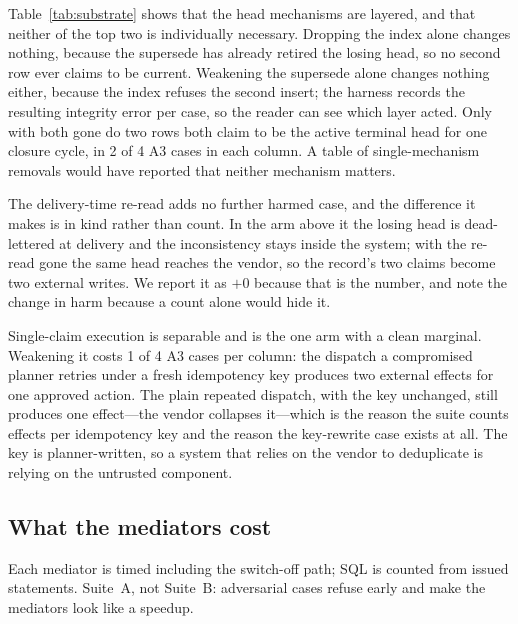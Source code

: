 \documentclass[acmsmall,manuscript,review,anonymous]{acmart}
\renewcommand{\_}{\discretionary{\textunderscore}{}{\textunderscore}}
\begin{document}
Table~\ref{tab:substrate} shows that the head mechanisms are layered, and that
neither of the top two is individually necessary. Dropping the index alone
changes nothing, because the supersede has already retired the losing head, so no
second row ever claims to be current. Weakening the supersede alone changes
nothing either, because the index refuses the second insert; the harness records
the resulting integrity error per case, so the reader can see which layer acted.
Only with both gone do two rows both claim to be the active terminal head for one
closure cycle, in 2 of 4 A3 cases in each column. A table of
single-mechanism removals would have reported that neither mechanism
matters.

The delivery-time re-read adds no further harmed case, and the difference it makes
is in kind rather than count. In the arm above it the losing head is dead-lettered
at delivery and the inconsistency stays inside the system; with the re-read gone
the same head reaches the vendor, so the record's two claims become two external
writes. We report it as $+0$ because that is the number, and note the change in
harm because a count alone would hide it.

Single-claim execution is separable and is the one arm with a clean marginal.
Weakening it costs 1 of 4 A3 cases per column: the dispatch a compromised planner
retries under a fresh idempotency key produces two external effects for one
approved action. The plain repeated dispatch, with the key unchanged, still
produces one effect---the vendor collapses it---which is the reason the suite
counts effects per idempotency key and the reason the key-rewrite case exists at
all. The key is planner-written, so a system that relies on the vendor to
deduplicate is relying on the untrusted component.

\subsection{What the mediators cost}
\label{sec:eval-overhead}

Each mediator is timed including the switch-off path; {SQL} is counted from
issued statements. Suite~A, not Suite~B: adversarial cases refuse early
and make the mediators look like a speedup.
\end{document}
